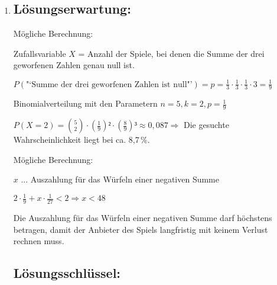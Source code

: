 \begin{langesbeispiel}
{\begin{enumerate}
Bei $Y$ hat jeder Wert die gleiche Wahrscheinlichkeit $\left(=\frac{1}{9}\right)$, bei $X$ hat 4 die größte Wahrscheinlichkeit $\left(=3\cdot\frac{1}{3}\cdot\frac{1}{3}=\frac{1}{3}\right)$. Der Unterschied ist bei 4 am größten, er beträgt $\frac{2}{9}$.

oder:

Die Wahrscheinlichkeit für 4 ist bei Herrn Fischer dreimal so groß wie bei Frau Fischer.

	\subsection{Lösungsschlüssel:}
	\begin{itemize}
		\item Ein Ausgleichspunkt für die vollständige Angabe der korrekten Werte für $Y$. 
		\item Ein Punkt für die Angabe des gesuchten Wertes und einer korrekten Berechnung des Unterschieds.
	\end{itemize}
	
	\item \subsection{Lösungserwartung:}
			
	Mögliche Berechnung:
	
	Zufallsvariable $X$ = Anzahl der Spiele, bei denen die Summe der drei geworfenen Zahlen genau null ist.
	
	$P(\text{"`Summe der drei geworfenen Zahlen ist null"'})=p=\frac{1}{3}\cdot\frac{1}{3}\cdot\frac{1}{3}\cdot 3=\frac{1}{9}$
	
	Binomialverteilung mit den Parametern $n=5, k=2, p=\frac{1}{9}$
	
	$P(X=2)=\binom{5}{2}\cdot\left(\frac{1}{9}\right)²\cdot\left(\frac{8}{9}\right)³\approx 0,087 \Rightarrow$ Die gesuchte Wahrscheinlichkeit liegt bei ca. 8,7\,\%.
	
	Mögliche Berechnung:
	
	$x$ ... Auszahlung für das Würfeln einer negativen Summe
	
	$2\cdot\frac{1}{9}+x\cdot\frac{1}{27}<2 \Rightarrow x<48$
	
	Die Auszahlung für das Würfeln einer negativen Summe darf höchstens  betragen, damit der Anbieter des Spiels langfristig mit keinem Verlust rechnen muss.

	\subsection{Lösungsschlüssel:}
	

\end{enumerate}}
\end{langesbeispiel}
